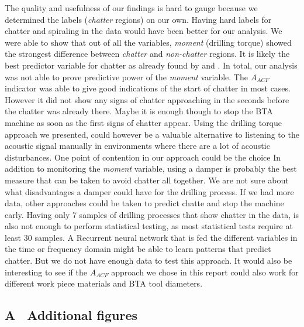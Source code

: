 \documentclass[12 pt]{scrartcl}
\begin{document}
The quality and usefulness of our findings is hard to gauge because we determined the labels (\emph{chatter} regions) on our own. Having hard labels for chatter and spiraling in the data would have been better for our analysis. We were able to show that out of all the variables, \emph{moment} (drilling torque) showed the strongest difference between \emph{chatter} and \emph{non-chatter} regions. It is likely the best predictor variable for chatter as already found by \citet{deistler2022time} and \citep[p.~27]{theis2004modelling}.
In total, our analysis was not able to prove predictive power of the \emph{moment} variable. The $A_{ACF}$ indicator was able to give good indications of the start of chatter in most cases. However it did not show any signs of chatter approaching in the seconds before the chatter was already there. Maybe it is enough though to stop the BTA machine as soon as the first signs of chatter appear. Using the drilling torque approach we presented, could however be a valuable alternative to listening to the acoustic signal manually in environments where there are a lot of acoustic disturbances. One point of contention in our approach could be the choice
In addition to monitoring the \emph{moment} variable, using a damper is probably the best measure that can be taken to avoid chatter all together. We are not sure about what disadvantages a damper could have for the drilling process. If we had more data, other approaches could be taken to predict chatte and stop the machine early. Having only 7 samples of drilling processes that show chatter in the data, is also not enough to perform statistical testing, as most statistical tests require at least 30 samples. A Recurrent neural network that is fed the different variables in the time or frequency domain might be able to learn patterns that predict chatter. But we do not have enough data to test this approach.
It would also be interesting to see if the $A_{ACF}$ approach we chose in this report could also work for different work piece materials and BTA tool diameters.

\newpage
{}
\renewcommand\refname{Bibliography}


\newpage
\appendix
{}
\subsection*{A \ Additional figures}
\end{document}
